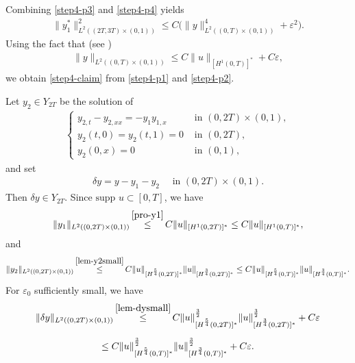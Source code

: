 \documentclass[11pt, reqno]{amsart}
\newcommand{\eps}{\varepsilon}
\theoremstyle{plain}
\numberwithin{equation}{section}
\begin{document}
        Combining \eqref{step4-p3} and \eqref{step4-p4} yields 
 \begin{align}	\label{step4-p2}
	\|y_1^*\|^2_{L^2((2T, 3T) \times (0, 1))} \leq C \Big( \|y\|^4_{L^2((0, T) \times (0, 1))} + \eps^2 \Big).
\end{align}   
Using the fact that (see )
         \begin{align*}
\|y\|_{L^2((0, T) \times (0, 1))} \leq C \|u\|_{[H^1(0, T)]^*} + C \varepsilon, 
       \end{align*}
we obtain  \eqref{step4-claim} from  \eqref{step4-p1} and
\eqref{step4-p2}.  
        
\medskip

Let $y_2 \in Y_{2T}$ be the solution of
\begin{align}
	    \begin{cases}
                y_{2,t} - y_{2, xx} = -y_1 y_{1,x}  \quad &\text{ in } (0, 2T) \times (0, 1), \\[6pt]
                y_2(t, 0) = y_2(t, 1) = 0 &\text{ in } (0, 2T), \\[6pt]
                y_2(0, x) = 0 &\text{ in } (0, 1),
            \end{cases}
\end{align}
and set
\begin{align}	\delta y = y - y_1 - y_2 \quad \text{ in } (0, 2T) \times (0, 1).
\end{align}    
Then $\delta y \in Y_{2T}$. Since $\mbox{supp } u \subset [0, T]$, we have
	\begin{align}	\label{proof-y1}
			\|y_1 \|_{L^2((0, 2T) \times (0, 1))} \mathop{\leq}^{\Cref{pro-y1}} C \|u\|_{[H^1(0, 2T)]^*} \leq C \|u\|_{[H^1(0, T)]^*}, 
		\end{align}
		and 
           \begin{align}	\label{proof-y2}
           		\|y_2 \|_{L^2((0, 2T) \times (0, 1))} \mathop{\leq}^{\Cref{lem-y2small}} C \|u\|_{[H^{\frac{5}{4}}(0, 2T)]^*} \|u\|_{[H^{\frac{3}{4}}(0, 2T)]^*} \le  C \|u\|_{[H^{\frac{5}{4}}(0, T)]^*} \|u\|_{[H^{\frac{3}{4}}(0, T)]^*}.
           \end{align}
For $\varepsilon_0$ sufficiently small, we have 
           \begin{multline}	\label{proof-deltay}
           		 \|\delta y \|_{L^2((0, 2T) \times (0, 1))} \mathop{\leq}^{\Cref{lem-dysmall}} C  \|u\|_{[H^{\frac{5}{4}}(0, 2T)]^*}^{\frac{3}{2}} \|u\|_{[H^{\frac{3}{4}}(0, 2T)]^*}^{\frac{3}{2}} + C \varepsilon \\[6pt]
		\leq C  \|u\|_{[H^{\frac{5}{4}}(0, T)]^*}^{\frac{3}{2}} \|u\|_{[H^{\frac{3}{4}}(0, T)]^*}^{\frac{3}{2}} + C \varepsilon.
           \end{multline}
     
\end{document}
